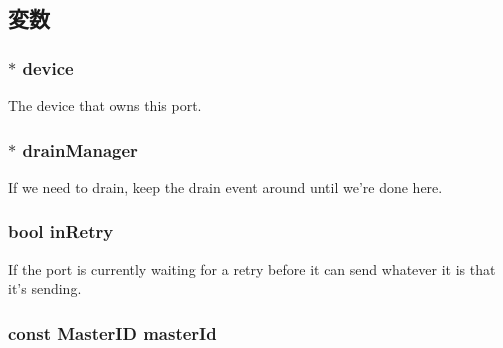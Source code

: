 \subsection{変数}
\hypertarget{classDmaPort_a4be8e04a8b8092d55e6b8707f95c1921}{
\subsubsection[{device}]{$\ast$ {\bf device}}}
\label{classDmaPort_a4be8e04a8b8092d55e6b8707f95c1921}
The device that owns this port. \hypertarget{classDmaPort_a329b71fb934a93312ca0aacbf5a3f982}{
\subsubsection[{drainManager}]{$\ast$ {\bf drainManager}}}
\label{classDmaPort_a329b71fb934a93312ca0aacbf5a3f982}
If we need to drain, keep the drain event around until we're done here. \hypertarget{classDmaPort_a86588337eae6e277173a8da0cb966462}{
\subsubsection[{inRetry}]{\setlength{\rightskip}{0pt plus 5cm}bool {\bf inRetry}}}
\label{classDmaPort_a86588337eae6e277173a8da0cb966462}
If the port is currently waiting for a retry before it can send whatever it is that it's sending. \hypertarget{classDmaPort_a4fe950c0a01bfb6dd81ee92b18162d26}{
\subsubsection[{masterId}]{\setlength{\rightskip}{0pt plus 5cm}const {\bf MasterID} {\bf masterId}}}
\label{classDmaPort_a4fe950c0a01bfb6dd81ee92b18162d26}
